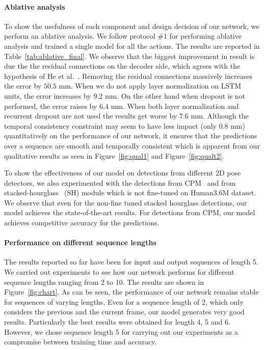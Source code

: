\documentclass[runningheads]{llncs}
\begin{document}
\paragraph{Ablative analysis}
To show the usefulness of each component and design decision of our network, we perform an ablative analysis. We follow protocol \#1 for performing ablative analysis and trained a single model for all the actions. The results are reported in Table~\ref{tab:ablative_final}. We observe that the biggest improvement in result is due the the residual connections on the decoder side, which agrees with the hypothesis of He et al.~\cite{he2016deep}. Removing the residual connections massively increases the error by $50.5$ mm. When we do not apply layer normalization on LSTM units, the error increases by $9.2$ mm. On the other hand when dropout is not performed, the error raises by $6.4$ mm. When both layer normalization and recurrent dropout are not used the results get worse by $7.6$ mm. Although the temporal consistency constraint may seem to have less impact (only $0.8$ mm) quantitatively on the performance of our network, it ensures that the predictions over a sequence are smooth and temporally consistent which is apparent from our qualitative results as seen in Figure~\ref{fig:qual1} and Figure~\ref{fig:qualt2}. 

To show the effectiveness of our model on detections from different 2D pose detectors, we also experimented with the detections from CPM~\cite{cpm} and from stacked-hourglass~\cite{stacked-hourglass} (SH) module which is not fine-tuned on Human3.6M dataset. We observe that even for the non-fine tuned stacked hourglass detections, our model achieves the state-of-the-art results. For detections from CPM, our model achieves competitive accuracy for the predictions.

\paragraph{Performance on different sequence lengths}
The results reported so far have been for input and output sequences of length 5. We carried out experiments to see how our network performs for different sequence lengths ranging from 2 to 10. The results are shown in Figure~\ref{fig:chart}. As can be seen, the performance of our network remains stable for sequences of varying lengths. Even for a sequence length of 2, which only considers the previous and the current frame, our model generates very good results. Particularly the best results were obtained for length 4, 5 and 6. However, we chose sequence length 5 for carrying out our experiments as a compromise between training time and accuracy. 
\end{document}
